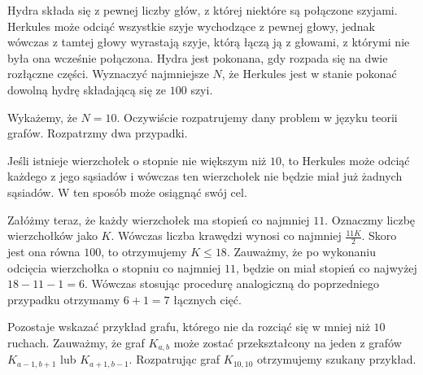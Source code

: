 \vspace{5px}

\begin{problem}{6}
	Hydra składa się z pewnej liczby głów, z której niektóre są połączone szyjami. Herkules może odciąć wszystkie szyje wychodzące z pewnej głowy, jednak wówczas z tamtej głowy wyrastają szyje, którą łączą ją z głowami, z którymi nie była ona wcześnie połączona. Hydra jest pokonana, gdy rozpada się na dwie rozłączne części. Wyznaczyć najmniejsze $N$, że Herkules jest w stanie pokonać dowolną hydrę składającą się ze $100$ szyi.
\end{problem}

\noindent
Wykażemy, że $N = 10$. Oczywiście rozpatrujemy dany problem w języku teorii grafów. Rozpatrzmy dwa przypadki.

\vspace{10px}
\noindent
Jeśli istnieje wierzchołek o stopnie nie większym niż $10$, to Herkules może odciąć każdego z jego sąsiadów i wówczas ten wierzchołek nie będzie miał już żadnych sąsiadów. W ten sposób może osiągnąć swój cel.

\vspace{10px}
\noindent
Załóżmy teraz, że każdy wierzchołek ma stopień co najmniej $11$. Oznaczmy liczbę wierzchołków jako $K$. Wówczas liczba krawędzi wynosi co najmniej $\frac{11K}{2}$. Skoro jest ona równa $100$, to otrzymujemy $K \leqslant 18$. Zauważmy, że po wykonaniu odcięcia wierzchołka o stopniu co najmniej $11$, będzie on miał stopień co najwyżej $18 - 11 - 1 = 6$. Wówczas stosując procedurę analogiczną do poprzedniego przypadku otrzymamy $6 + 1 = 7$ łącznych cięć.


Pozostaje wskazać przykład grafu, którego nie da rozciąć się w mniej niż $10$ ruchach. Zauważmy, że graf $K_{a,b}$ może zostać przekształcony na jeden z grafów $K_{a - 1,b + 1}$ lub $K_{a + 1,b - 1}$. Rozpatrując graf $K_{10,10}$ otrzymujemy szukany przykład.
